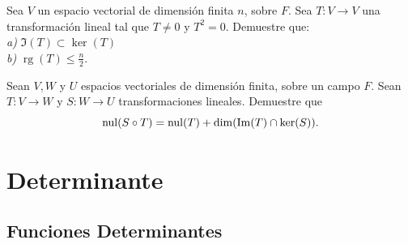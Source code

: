\documentclass[12pt,a4paper]{book}
\newcommand{\rg}{\operatorname{rg}}
\begin{document}
    \begin{ejercicio}
        Sea $V$ un espacio vectorial de dimensión finita $n$, sobre $F$. Sea $T:V\to V$
        una transformación lineal tal que $T\neq 0$ y $T^{2}=0$. Demuestre que:\\
        \textit{a)} $\Im(T)\subset\ker(T)$\\
        \textit{b)} $\rg(T)\leq\frac{n}{2}$.
    \end{ejercicio}

    \begin{ejercicio}
        Sean $V,W$ y $U$ espacios vectoriales de dimensión finita, sobre un campo $F$. Sean $T:V\to W$ y $S:W\to U$ transformaciones lineales.
        Demuestre que
        \begin{equation*}
            \operatorname{nul}(S\circ T)=\operatorname{nul}(T)+\dim(\Im(T)\cap\ker(S)).
        \end{equation*}
    \end{ejercicio}

    \ncinterludio
    \chapter{Determinante}

    \section{Funciones Determinantes}
\end{document}
